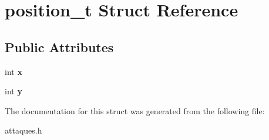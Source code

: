 \hypertarget{structposition__t}{}\section{position\+\_\+t Struct Reference}
\label{structposition__t}
\subsection*{Public Attributes}
\begin{DoxyCompactItemize}
\item 
\mbox{\label{structposition__t_a6f81865a98e5c5ee33d6bf42dd4efe06}} 
int {\bfseries x}
\item 
\mbox{\label{structposition__t_acfe2d471728cfdd56a9f910e4e697a17}} 
int {\bfseries y}
\end{DoxyCompactItemize}


The documentation for this struct was generated from the following file\+:\begin{DoxyCompactItemize}
\item 
attaques.\+h\end{DoxyCompactItemize}
